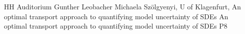 {HH Auditorium}	%
{Gunther Leobacher}		%
{Michaela Szölgyenyi, U of Klagenfurt, An optimal transport approach to quantifying model uncertainty of SDEs}	%
{An optimal transport approach to quantifying model uncertainty of SDEs}		%
{P8}		%
\\\hline
